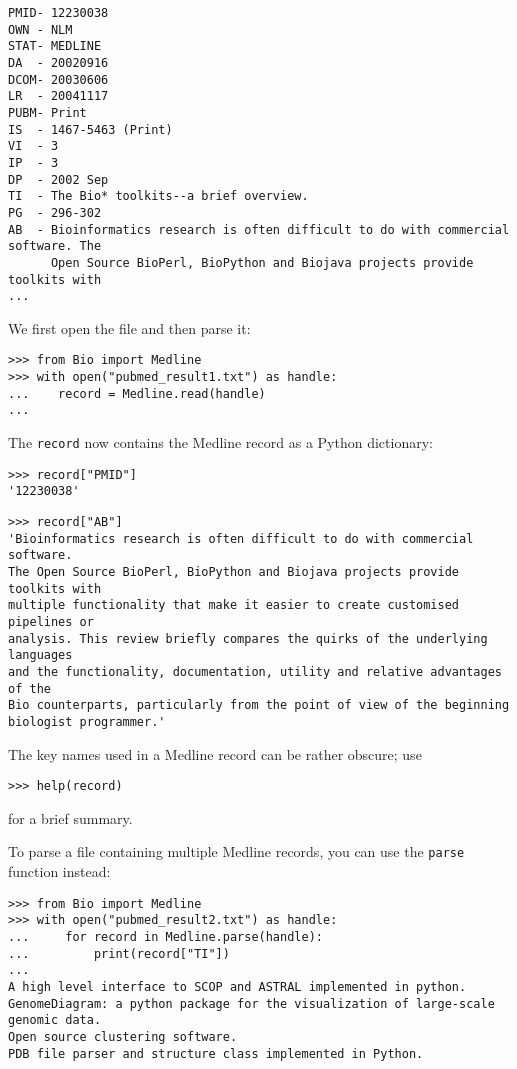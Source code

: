 \begin{verbatim}
PMID- 12230038
OWN - NLM
STAT- MEDLINE
DA  - 20020916
DCOM- 20030606
LR  - 20041117
PUBM- Print
IS  - 1467-5463 (Print)
VI  - 3
IP  - 3
DP  - 2002 Sep
TI  - The Bio* toolkits--a brief overview.
PG  - 296-302
AB  - Bioinformatics research is often difficult to do with commercial software. The
      Open Source BioPerl, BioPython and Biojava projects provide toolkits with
...
\end{verbatim}
We first open the file and then parse it:

\begin{verbatim}
>>> from Bio import Medline
>>> with open("pubmed_result1.txt") as handle:
...    record = Medline.read(handle)
...
\end{verbatim}
The \verb+record+ now contains the Medline record as a Python dictionary:

\begin{verbatim}
>>> record["PMID"]
'12230038'
\end{verbatim}
\begin{verbatim}
>>> record["AB"]
'Bioinformatics research is often difficult to do with commercial software.
The Open Source BioPerl, BioPython and Biojava projects provide toolkits with
multiple functionality that make it easier to create customised pipelines or
analysis. This review briefly compares the quirks of the underlying languages
and the functionality, documentation, utility and relative advantages of the
Bio counterparts, particularly from the point of view of the beginning
biologist programmer.'
\end{verbatim}
The key names used in a Medline record can be rather obscure; use
\begin{verbatim}
>>> help(record)
\end{verbatim}
for a brief summary.

To parse a file containing multiple Medline records, you can use the \verb+parse+ function instead:

\begin{verbatim}
>>> from Bio import Medline
>>> with open("pubmed_result2.txt") as handle:
...     for record in Medline.parse(handle):
...         print(record["TI"])
...
A high level interface to SCOP and ASTRAL implemented in python.
GenomeDiagram: a python package for the visualization of large-scale genomic data.
Open source clustering software.
PDB file parser and structure class implemented in Python.
\end{verbatim}

